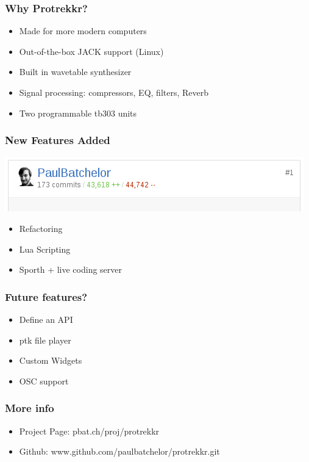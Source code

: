 \documentclass{beamer}
\begin{document}
\begin{frame}
\frametitle{Why Protrekkr?}
\begin{itemize}
    \item{Made for more modern computers}
    \item{Out-of-the-box JACK support (Linux)}
    \item{Built in wavetable synthesizer}
    \item{Signal processing: compressors, EQ, filters, Reverb}
    \item{Two programmable tb303 units}
\end{itemize}

\end{frame}

\begin{frame}
\frametitle{New Features Added}
\includegraphics[scale=0.3]{git}
\begin{itemize}
    \item{Refactoring}
    \item{Lua Scripting}
    \item{Sporth + live coding server}
\end{itemize}
\end{frame}

\begin{frame}
\frametitle{Future features?}
\begin{itemize}
    \item{Define an API}
    \item{ptk file player}
    \item{Custom Widgets}
    \item{OSC support}
\end{itemize}
\end{frame}

\begin{frame}
\frametitle{More info}
\begin{itemize}
    \item{Project Page: pbat.ch/proj/protrekkr}
    \item{Github: www.github.com/paulbatchelor/protrekkr.git}
\end{itemize}
\end{frame}
\end{document}
